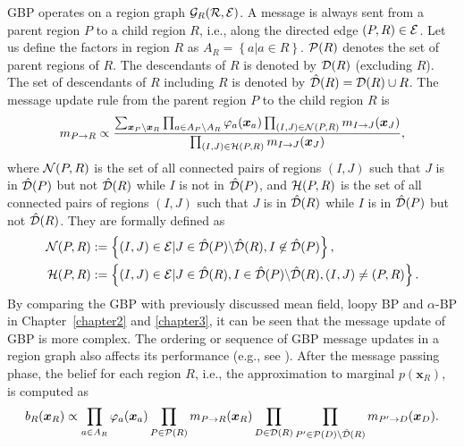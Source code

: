 GBP operates on a region graph $\mathcal{G}_R(\mathcal{R},\mathcal{E})$. A message is always sent from a parent region $P$ to a child region $R$, i.e., along the directed edge $(P, R)\in \mathcal{E}$. Let us define the factors in region $R$ as $A_R = \left\{ a | a \in R \right\}$. $\mathcal{P}(R)$ denotes the set of parent regions of $R$. The descendants of $R$ is denoted by $\mathcal{D}(R)$ (excluding $R$). The set of descendants of $R$ including $R$ is denoted by $\hat{\mathcal{D}}(R) = \mathcal{D}(R) \cup R$. The message update rule from the parent region $P$ to the child region $R$ is
\begin{align}\label{chpt4:eq-gbp-update-rule}
  m_{P\rightarrow R} \propto \frac{\sum_{\bm{x}_P\backslash
  \bm{x}_R}\prod_{a\in A_P\backslash A_R}\varphi_a(\bm{x}_a)\prod_{(I,J)
  \in \mathcal{N}(P, R)}m_{I\rightarrow J}(\bm{x}_J)}{\prod_{(I,J)
  \in \mathcal{H}(P, R)}m_{I\rightarrow J}(\bm{x}_J)},
\end{align}
where $\mathcal{N}(P, R)$ is the set of all connected pairs of regions $(I, J)$ such that $J$ is in $\hat{\mathcal{D}}(P)$ but not $\hat{\mathcal{D}}(R)$ while $I$ is not in $\hat{\mathcal{D}}(P)$, and $\mathcal{H}(P, R)$ is the set of all connected pairs of regions $(I, J)$ such that $J$ is in $\hat{\mathcal{D}}(R)$ while $I$ is in $\hat{\mathcal{D}}(P)$ but not $\hat{\mathcal{D}}(R)$. They are formally defined as
\begin{align}\label{chpt4:eq:gbp-two-sets}
  \mathcal{N}(P, R) &:= \left\{ (I,J)\in \mathcal{E} | J \in \hat{\mathcal{D}}(P) \backslash \hat{\mathcal{D}}(R), I \not\in \hat{\mathcal{D}}(P)\right\},\nonumber \\
  \mathcal{H}(P, R) &:= \left\{ (I,J) \in \mathcal{E} | J \in \hat{\mathcal{D}}(R), I \in \hat{\mathcal{D}}(P) \backslash \hat{\mathcal{D}}(R), (I,J) \neq (P,R) \right\}.
\end{align}
By comparing the GBP with previously discussed mean field, loopy BP and $\alpha$-BP in Chapter~\ref{chapter2} and \ref{chapter3}, it can be seen that the message update of GBP is more complex. The ordering or sequence of GBP message updates in a region graph also affects its performance (e.g., see \cite{yedida2005constucting}). After the message passing phase, the belief for each region $R$, i.e., the approximation to marginal $p(\bm{x}_{R})$, is computed as
\begin{align}\label{chpt4:gbp-belief-rule}
  b_R(\bm{x}_R) \propto \prod_{a\in A_R} \varphi_a(\bm{x}_a) \prod_{P\in
  \mathcal{P}(R)} m_{P\rightarrow R}(\bm{x}_R) \prod_{D\in \mathcal{D}(R)} \prod_{P^{\prime} \in \mathcal{P}(D) \backslash \hat{\mathcal{D}}(R)} m_{P^{\prime}\rightarrow D}(\bm{x}_D).
\end{align}


